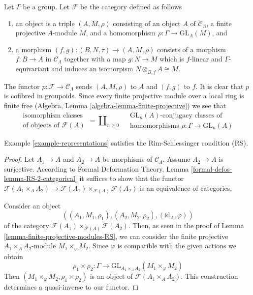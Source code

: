 \begin{example}
\label{example-representations}
Let $\Gamma$ be a group.
Let $\mathcal{F}$ be the category defined as follows
\begin{enumerate}
\item an object is a triple $(A, M, \rho)$ consisting of an
object $A$ of $\mathcal{C}_\Lambda$, a finite projective $A$-module $M$,
and a homomorphism $\rho : \Gamma \to \text{GL}_A(M)$, and
\item a morphism $(f, g) : (B, N, \tau) \to (A, M, \rho)$ consists of
a morphism $f : B \to A$ in $\mathcal{C}_\Lambda$ together
with a map $g : N \to M$ which is $f$-linear and $\Gamma$-equivariant
and induces an isomorpism $N \otimes_{B, f} A \cong M$.
\end{enumerate}
The functor $p : \mathcal{F} \to \mathcal{C}_\Lambda$ sends $(A, M, \rho)$
to $A$ and $(f, g)$ to $f$. It is clear that $p$ is cofibred in groupoids.
Since every finite projective module over a local ring is finite free
(Algebra, Lemma \ref{algebra-lemma-finite-projective})
we see that
$$
\begin{matrix}
\text{isomorphism classes} \\
\text{of objects of }\mathcal{F}(A)
\end{matrix}
=
\coprod\nolimits_{n \geq 0}\quad
\begin{matrix}
\text{GL}_n(A)\text{-conjugacy classes of}\\
\text{homomorphisms }\rho : \Gamma \to \text{GL}_n(A)
\end{matrix}
$$
\end{example}

\begin{lemma}
\label{lemma-representations-RS}
Example \ref{example-representations}
satisfies the Rim-Schlessinger condition (RS).
\end{lemma}

\begin{proof}
Let $A_1 \to A$ and $A_2 \to A$ be morphisms of $\mathcal{C}_\Lambda$.
Assume $A_2 \to A$ is surjective. According to
Formal Deformation Theory, Lemma
\ref{formal-defos-lemma-RS-2-categorical}
it suffices to show that the functor
$\mathcal{F}(A_1 \times_A A_2) \to
\mathcal{F}(A_1) \times_{\mathcal{F}(A)} \mathcal{F}(A_2)$
is an equivalence of categories.

\medskip\noindent
Consider an object
$$
((A_1, M_1, \rho_1), (A_2, M_2, \rho_2), (\text{id}_A, \varphi))
$$
of the category $\mathcal{F}(A_1) \times_{\mathcal{F}(A)} \mathcal{F}(A_2)$.
Then, as seen in the proof of Lemma \ref{lemma-finite-projective-modules-RS},
we can consider the finite projective
$A_1 \times_A A_2$-module $M_1 \times_\varphi M_2$.
Since $\varphi$ is compatible with the given actions we obtain
$$
\rho_1 \times \rho_2 : \Gamma \longrightarrow
\text{GL}_{A_1 \times_A A_2}(M_1 \times_\varphi M_2)
$$
Then $(M_1 \times_\varphi M_2, \rho_1 \times \rho_2)$
is an object of $\mathcal{F}(A_1 \times_A A_2)$.
This construction determines a quasi-inverse to our functor.
\end{proof}

